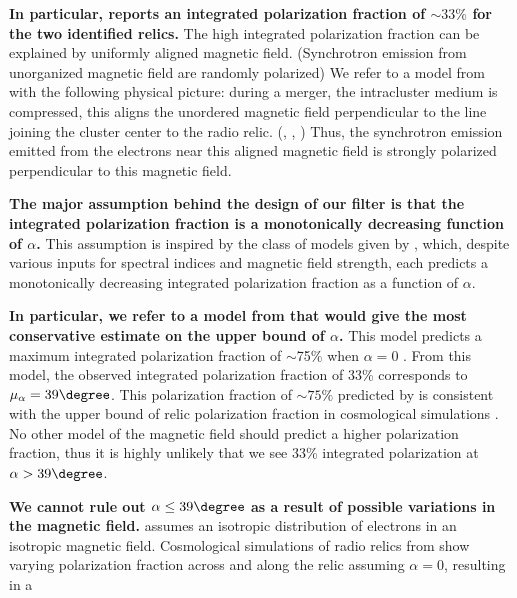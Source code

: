 \textbf{In particular, \cite{L13} reports an integrated
polarization fraction of $\sim33\%$ for the two identified relics.} The
high integrated polarization fraction can be explained by uniformly aligned
magnetic field. (Synchrotron emission from unorganized magnetic field are
randomly polarized) We refer to a model from \citet{E98} with
the following physical picture: during a merger, the intracluster medium is compressed, this aligns the unordered
magnetic field perpendicular to the line joining the cluster center to the
radio relic. (\citealt{E98}, \citealt{vanWeeren10}, \citealt{Feretti12})
Thus, the synchrotron emission emitted from the electrons near this aligned
magnetic field is strongly polarized perpendicular to this magnetic field. \par
\textbf{The major assumption behind the design of our filter
is that the integrated polarization fraction is a monotonically
decreasing function of $\alpha$.} 
This assumption is inspired by the class of models given by \cite{E98}, 
which, despite various inputs for spectral indices and magnetic field strength, each predicts a monotonically decreasing integrated
polarization fraction as a function of $\alpha$. 
\par 
\textbf{In particular, we refer to a model from \cite{E98} that would give the most conservative estimate on the upper bound of $\alpha$.} 
This model predicts a maximum integrated polarization fraction of
$\sim$75\% when $\alpha = 0$ . From this model, the observed integrated
polarization fraction of 33\% corresponds to $\mu_\alpha =  39\degree$. 
This  polarization fraction of $\sim 75\%$ predicted by \citep{E98} is
consistent with the upper bound of relic polarization fraction in cosmological
simulations \citep{S13}. No other model of the magnetic field should predict a higher polarization fraction, thus it is highly unlikely that we see 33\%
integrated polarization at $\alpha > 39\degree$. \par 
\textbf{We cannot rule out $\alpha \leq 39\degree$ as a result of possible
variations in the magnetic field.} \cite{E98} assumes an isotropic
distribution of electrons in an isotropic magnetic field. Cosmological
simulations of radio relics from \cite{S13} show varying polarization
fraction across and along the relic assuming $\alpha = 0$, resulting in a

